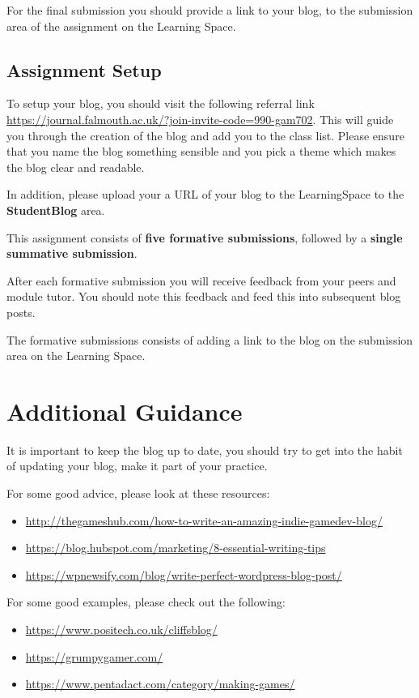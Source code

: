 \documentclass{../../fal_assignment}
\begin{document}
For the final submission you should provide a link to your blog, to the submission area of the assignment on the Learning Space. 

\subsection*{Assignment Setup} 

To setup your blog, you should visit the following referral link \url{https://journal.falmouth.ac.uk/?join-invite-code=990-gam702}. This will guide you
through the creation of the blog and add you to the class list. Please ensure that you name the blog something sensible and you pick a theme which makes the blog clear and readable.

In addition, please upload your a URL of your blog to the LearningSpace to the \textbf{StudentBlog} area.

This assignment consists of \textbf{five formative submissions}, followed by a \textbf{single summative submission}.

After each formative submission you will receive feedback from your peers and module tutor. You should note this feedback and feed this into subsequent blog posts.  

The formative submissions consists of adding a link to the blog on the submission area on the Learning Space.


\section*{Additional Guidance}

It is important to keep the blog up to date, you should try to get into the habit of updating your blog, make it part of your practice.   

For some good advice, please look at these resources:
\begin{itemize}
	\item \url{http://thegameshub.com/how-to-write-an-amazing-indie-gamedev-blog/}
	\item \url{https://blog.hubspot.com/marketing/8-essential-writing-tips}
	\item \url{https://wpnewsify.com/blog/write-perfect-wordpress-blog-post/}
\end{itemize}

For some good examples, please check out the following:
\begin{itemize}
	\item \url{https://www.positech.co.uk/cliffsblog/}
	\item \url{https://grumpygamer.com/}
	\item \url{https://www.pentadact.com/category/making-games/}
\end{itemize}
\end{document}
